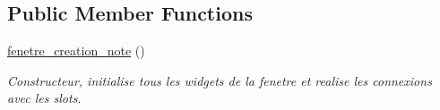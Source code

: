 \subsection*{Public Member Functions}
\begin{DoxyCompactItemize}
\item 
\mbox{\label{classfenetre__creation__note_a5f6330502db3b9ea8950ce1f859a8c42}} 
\hyperlink{classfenetre__creation__note_a5f6330502db3b9ea8950ce1f859a8c42}{fenetre\+\_\+creation\+\_\+note} ()
\begin{DoxyCompactList}\small\item\em Constructeur, initialise tous les widgets de la fenetre et realise les connexions avec les slots. \end{DoxyCompactList}\end{DoxyCompactItemize}
